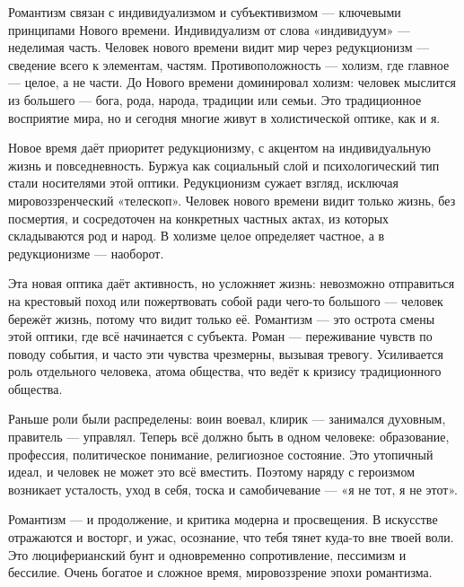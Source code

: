 Романтизм связан с индивидуализмом и субъективизмом --- ключевыми принципами Нового времени. Индивидуализм от слова «индивидуум» --- неделимая часть. Человек нового времени видит мир через редукционизм --- сведение всего к элементам, частям. Противоположность --- холизм, где главное --- целое, а не части. До Нового времени доминировал холизм: человек мыслится из большего --- бога, рода, народа, традиции или семьи. Это традиционное восприятие мира, но и сегодня многие живут в холистической оптике, как и я.

Новое время даёт приоритет редукционизму, с акцентом на индивидуальную жизнь и повседневность. Буржуа как социальный слой и психологический тип стали носителями этой оптики. Редукционизм сужает взгляд, исключая мировоззренческий «телескоп». Человек нового времени видит только жизнь, без посмертия, и сосредоточен на конкретных частных актах, из которых складываются род и народ. В холизме целое определяет частное, а в редукционизме --- наоборот.

Эта новая оптика даёт активность, но усложняет жизнь: невозможно отправиться на крестовый поход или пожертвовать собой ради чего-то большого --- человек бережёт жизнь, потому что видит только её. Романтизм --- это острота смены этой оптики, где всё начинается с субъекта. Роман --- переживание чувств по поводу события, и часто эти чувства чрезмерны, вызывая тревогу. Усиливается роль отдельного человека, атома общества, что ведёт к кризису традиционного общества.

Раньше роли были распределены: воин воевал, клирик --- занимался духовным, правитель --- управлял. Теперь всё должно быть в одном человеке: образование, профессия, политическое понимание, религиозное состояние. Это утопичный идеал, и человек не может это всё вместить. Поэтому наряду с героизмом возникает усталость, уход в себя, тоска и самобичевание --- «я не тот, я не этот».

Романтизм --- и продолжение, и критика модерна и просвещения. В искусстве отражаются и восторг, и ужас, осознание, что тебя тянет куда-то вне твоей воли. Это люциферианский бунт и одновременно сопротивление, пессимизм и бессилие. Очень богатое и сложное время, мировоззрение эпохи романтизма.


